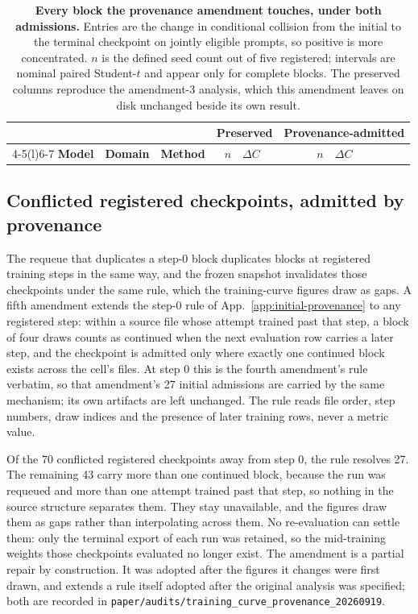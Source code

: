 \documentclass{article}
\newcommand{\1}{\mathbf 1}
\theoremstyle{remark}
\theoremstyle{definition}
\theoremstyle{plain}
\begin{document}
\begin{table}[H]
  \centering
  \caption{\textbf{Every block the provenance amendment touches, under both
  admissions.} Entries are the change in conditional collision from the initial
  to the terminal checkpoint on jointly eligible prompts, so positive is more
  concentrated. $n$ is the defined seed count out of five registered; intervals
  are nominal paired Student-$t$ and appear only for complete blocks. The
  preserved columns reproduce the amendment-3 analysis, which this amendment
  leaves on disk unchanged beside its own result.}
  \label{tab:initial-provenance}
  \small
  \setlength{\tabcolsep}{4pt}
  \begin{tabular}{@{}lll rl rl@{}}
    \toprule
    & & & \multicolumn{2}{c}{\textbf{Preserved}} & \multicolumn{2}{c}{\textbf{Provenance-admitted}} \\
    \cmidrule(lr){4-5}\cmidrule(l){6-7}
    \textbf{Model} & \textbf{Domain} & \textbf{Method} &
      $n$ & $\Delta C$ & $n$ & $\Delta C$ \\
    \midrule
    
  \end{tabular}
\end{table}

\subsection{Conflicted registered checkpoints, admitted by provenance}
\label{app:registered-provenance}

The requeue that duplicates a step-0 block duplicates blocks at registered
training steps in the same way, and the frozen snapshot invalidates those
checkpoints under the same rule, which the training-curve figures draw as gaps.
A fifth amendment extends the step-0 rule of App.~\ref{app:initial-provenance}
to any registered step: within a source file whose attempt trained past that
step, a block of four draws counts as continued when the next evaluation row
carries a later step, and the checkpoint is admitted only where exactly one
continued block exists across the cell's files. At step 0 this is the fourth
amendment's rule verbatim, so that amendment's 27 initial admissions are
carried by the same mechanism; its own artifacts are left unchanged. The rule
reads file order, step numbers, draw indices and the presence of later training
rows, never a metric value.

Of the 70 conflicted registered checkpoints away from step 0, the rule resolves
27. The remaining 43 carry more than one continued block, because the run was
requeued and more than one attempt trained past that step, so nothing in the
source structure separates them. They stay unavailable, and the figures draw
them as gaps rather than interpolating across them. No re-evaluation can settle
them: only the terminal export of each run was retained, so the mid-training
weights those checkpoints evaluated no longer exist. The amendment is a partial
repair by construction. It was adopted after the figures it changes were first
drawn, and extends a rule itself adopted after the original analysis was
specified; both are recorded in
\texttt{paper/audits/training\_curve\_provenance\_20260919}.
\end{document}
